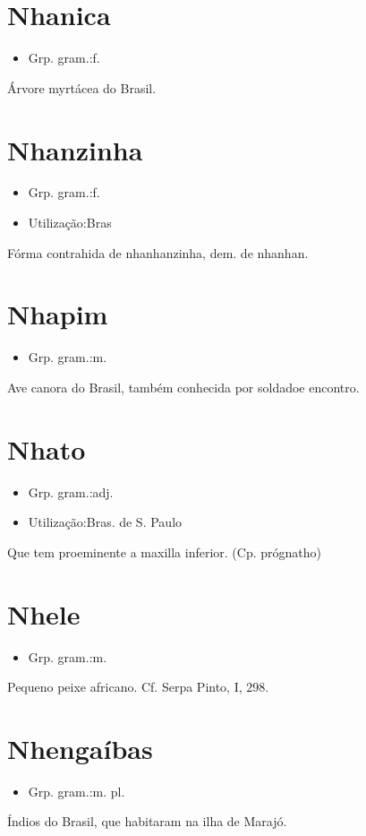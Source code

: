 \section{Nhanica}
\begin{itemize}
\item {Grp. gram.:f.}
\end{itemize}
Árvore myrtácea do Brasil.
\section{Nhanzinha}
\begin{itemize}
\item {Grp. gram.:f.}
\end{itemize}
\begin{itemize}
\item {Utilização:Bras}
\end{itemize}
Fórma contrahida de \textunderscore nhanhanzinha\textunderscore , dem. de \textunderscore nhanhan\textunderscore .
\section{Nhapim}
\begin{itemize}
\item {Grp. gram.:m.}
\end{itemize}
Ave canora do Brasil, também conhecida por \textunderscore soldado\textunderscore  e \textunderscore encontro\textunderscore .
\section{Nhato}
\begin{itemize}
\item {Grp. gram.:adj.}
\end{itemize}
\begin{itemize}
\item {Utilização:Bras. de S. Paulo}
\end{itemize}
Que tem proeminente a maxilla inferior.
(Cp. \textunderscore prógnatho\textunderscore )
\section{Nhele}
\begin{itemize}
\item {Grp. gram.:m.}
\end{itemize}
Pequeno peixe africano. Cf. Serpa Pinto, I, 298.
\section{Nhengaíbas}
\begin{itemize}
\item {Grp. gram.:m. pl.}
\end{itemize}
Índios do Brasil, que habitaram na ilha de Marajó.
